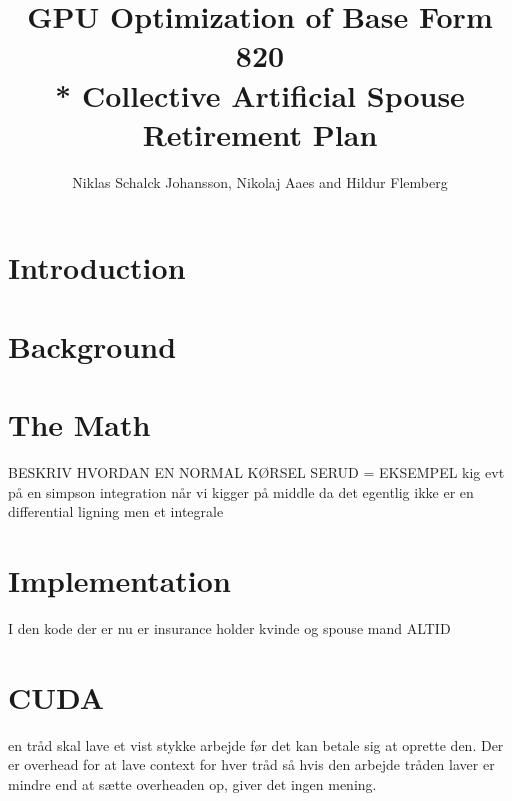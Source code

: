 \documentclass[oribibl]{llncs}
\title{GPU Optimization of Base Form 820 \\* Collective Artificial Spouse Retirement Plan}
\author{Niklas Schalck Johansson, Nikolaj Aaes and Hildur Flemberg\\
\email{\{nsjo, niaa, hufl\}@itu.dk}}
\institute{IT University of Copenhagen}
\begin{document}
	\maketitle
	\tableofcontents
	\pagebreak
	
	
	\begin{abstract}
		
		\label{abstract}
	\end{abstract}
	
	\section{Introduction}
	
	
	\label{introduction}
		
	\section{Background}
		
	
	\label{background}
		
	\section{The Math}
		
	
	\label{themath}
	
	BESKRIV HVORDAN EN NORMAL KØRSEL SERUD = EKSEMPEL
	kig evt på en simpson integration når vi kigger på middle da det egentlig ikke er en differential ligning men et integrale
		
	\section{Implementation}

	
	\label{implementation}
	I den kode der er nu er insurance holder kvinde og spouse mand ALTID
		
	\section{CUDA}
en tråd skal lave et vist stykke arbejde før det kan betale sig at oprette den. Der er overhead for at lave context for hver tråd så hvis den arbejde tråden laver er mindre end at sætte overheaden op, giver det ingen mening.
\end{document}
